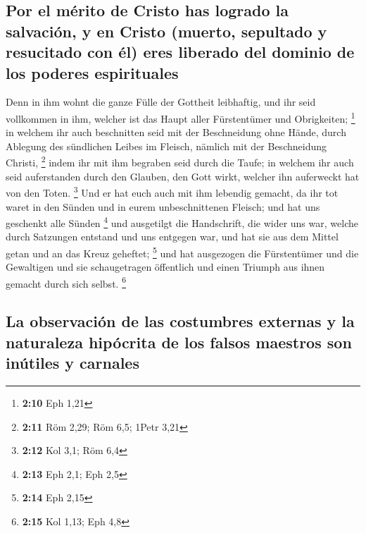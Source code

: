 \hypertarget{por-el-muxe9rito-de-cristo-has-logrado-la-salvaciuxf3n-y-en-cristo-muerto-sepultado-y-resucitado-con-uxe9l-eres-liberado-del-dominio-de-los-poderes-espirituales}{%
\subsection{Por el mérito de Cristo has logrado la salvación, y en
Cristo (muerto, sepultado y resucitado con él) eres liberado del dominio
de los poderes
espirituales}\label{por-el-muxe9rito-de-cristo-has-logrado-la-salvaciuxf3n-y-en-cristo-muerto-sepultado-y-resucitado-con-uxe9l-eres-liberado-del-dominio-de-los-poderes-espirituales}}

 Denn in ihm wohnt die ganze Fülle der Gottheit
leibhaftig,  und ihr seid vollkommen in ihm, welcher ist
das Haupt aller Fürstentümer und Obrigkeiten; \footnote{\textbf{2:10}
  Eph 1,21}  in welchem ihr auch beschnitten seid mit der
Beschneidung ohne Hände, durch Ablegung des sündlichen Leibes im
Fleisch, nämlich mit der Beschneidung Christi, \footnote{\textbf{2:11}
  Röm 2,29; Röm 6,5; 1Petr 3,21}  indem ihr mit ihm
begraben seid durch die Taufe; in welchem ihr auch seid auferstanden
durch den Glauben, den Gott wirkt, welcher ihn auferweckt hat von den
Toten. \footnote{\textbf{2:12} Kol 3,1; Röm 6,4}  Und er
hat euch auch mit ihm lebendig gemacht, da ihr tot waret in den Sünden
und in eurem unbeschnittenen Fleisch; und hat uns geschenkt alle Sünden
\footnote{\textbf{2:13} Eph 2,1; Eph 2,5}  und ausgetilgt
die Handschrift, die wider uns war, welche durch Satzungen entstand und
uns entgegen war, und hat sie aus dem Mittel getan und an das Kreuz
geheftet; \footnote{\textbf{2:14} Eph 2,15}  und hat
ausgezogen die Fürstentümer und die Gewaltigen und sie schaugetragen
öffentlich und einen Triumph aus ihnen gemacht durch sich selbst.
\footnote{\textbf{2:15} Kol 1,13; Eph 4,8}

\hypertarget{la-observaciuxf3n-de-las-costumbres-externas-y-la-naturaleza-hipuxf3crita-de-los-falsos-maestros-son-inuxfatiles-y-carnales}{%
\subsection{La observación de las costumbres externas y la naturaleza
hipócrita de los falsos maestros son inútiles y
carnales}\label{la-observaciuxf3n-de-las-costumbres-externas-y-la-naturaleza-hipuxf3crita-de-los-falsos-maestros-son-inuxfatiles-y-carnales}}

